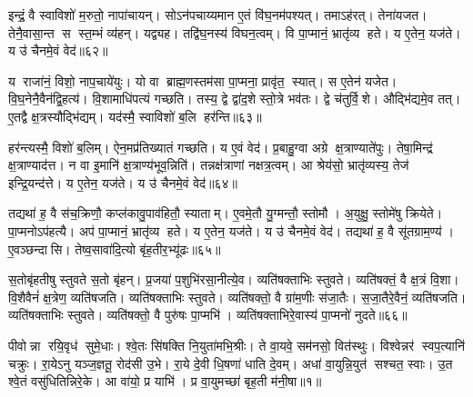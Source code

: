 इन्द्रं॒ वै स्वाविशो॑ म॒रुतो॒ नापा॑चायन्।
सोऽन॑पचाय्यमान ए॒तं वि॑घ॒नम॑पश्यत्।
तमाऽह॑रत्।
तेना॑यजत।
तेनै॒वासा॒न्त स स्त॒म्भं व्य॑हन्।
यद्व्यह\sn{}।
तद्वि॑घ॒नस्य॑ विघन॒त्वम्।
वि पा॒प्मानं॒ भ्रातृ॑व्य हते।
य ए॒तेन॒ यज॑ते।
य उ॑ चैनमे॒वं वेद॑॥६२॥

य राजा॑नं॒ विशो॒ नाप॒चाये॑युः।
यो वा ब्राह्म॒णस्तम॑सा पा॒प्मना॒ प्रावृ॑त॒ स्यात्।
स ए॒तेन॑ यजेत।
वि॒घ॒नेनै॒वैन॑द्वि॒हत्य॑।
वि॒शामाधि॑पत्यं गच्छति।
तस्य॒ द्वे द्वा॑द॒शे स्तो॒त्रे भव॑तः।
द्वे च॑तुर्वि॒शे।
औद्भि॑द्यमे॒व तत्।
ए॒तद्वै क्ष॒त्रस्यौद्भि॑द्यम्।
यद॑स्मै॒ स्वाविशो॑ ब॒लि हर॑न्ति॥६३॥

हर॑न्त्यस्मै॒ विशो॑ ब॒लिम्।
ऐन॒मप्र॑तिख्यातं गच्छति।
य ए॒वं वेद॑।
प्र॒बाहु॒ग्वा अग्रे क्ष॒त्राण्याते॑पुः।
तेषा॒मिन्द्र॑ क्ष॒त्राण्याद॑त्त।
न वा इ॒मानि॑ क्ष॒त्राण्य॑भूव॒न्निति॑।
तन्नक्ष॑त्राणां नक्षत्र॒त्वम्।
आ श्रेय॑सो॒ भ्रातृ॑व्यस्य॒ तेज॑ इन्द्रि॒यन्द॑त्ते।
य ए॒तेन॒ यज॑ते।
य उ॑ चैनमे॒वं वेद॑॥६४॥

तद्यथा॑ ह॒ वै स॑च॒क्रिणौ॒ कप्ल॑कावु॒पाव॑हितौ॒ स्याताम्।
ए॒वमे॒तौ यु॒ग्मन्तौ॒ स्तोमौ।
अ॒युक्षु॒ स्तोमे॑षु क्रियेते।
पा॒प्मनोऽप॑हत्यै।
अप॑ पा॒प्मानं॒ भ्रातृ॑व्य हते।
य ए॒तेन॒ यज॑ते।
य उ॑ चैनमे॒वं वेद॑।
तद्यथा॑ ह॒ वै सू॑तग्राम॒ण्य॑।
ए॒वञ्छन्दासि।
तेष्व॒सावा॑दि॒त्यो बृ॑ह॒तीर॒भ्यू॑ढः॥६५॥

स॒तोबृ॑हतीषु स्तुवते स॒तो बृ॑हन्।
प्र॒जया॑ प॒शुभि॑रसा॒नीत्ये॒व।
व्यति॑षक्ताभिः स्तुवते।
व्यति॑षक्तं॒ वै क्ष॒त्रं वि॒शा।
वि॒शैवैनं॑ क्ष॒त्रेण॒ व्यति॑षजति।
व्यति॑षक्ताभिः स्तुवते।
व्यति॑षक्तो॒ वै ग्रा॑म॒णीः स॑जा॒तैः।
स॒जा॒तैरे॒वैनं॒ व्यति॑षजति।
व्यति॑षक्ताभिः स्तुवते।
व्यति॑षक्तो॒ वै पुरु॑षः पा॒प्मभि॑।
व्यति॑षक्ताभिरे॒वास्य॑ पा॒प्मनो॑ नुदते॥६६॥\anuvakamend[वेद॒ हर॑न्त्येनमे॒वं वेदा॒भ्यू॑ढः पा॒प्मभि॒रेकं च]




\clearpage
{}
\setcounter{anuvakam}{0}

पीवोन्ना रयि॒वृध॑ सुमे॒धाः।
श्वे॒तः सि॑षक्ति नि॒युता॑मभि॒श्रीः।
ते वा॒यवे॒ सम॑नसो॒ वित॑स्थुः।
विश्वेन्नर॑ स्वप॒त्यानि॑ चक्रुः।
रा॒येऽनु यञ्ज॒ज्ञतू॒ रोद॑सी उ॒भे।
रा॒ये दे॒वी धि॒षणा॑ धाति दे॒वम्।
अधा॑ वा॒युन्नि॒युत॑ सश्चत॒ स्वाः।
उ॒त श्वे॒तं वसु॑धितिन्निरे॒के।
आ वा॑यो॒ प्र याभि॑।
प्र वा॒युमच्छा॑ बृह॒ती म॑नी॒षा॥१॥

